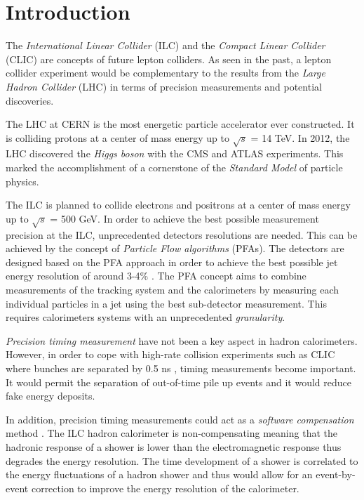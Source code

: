 \chapter{Introduction}

The \textit{International Linear Collider} (ILC) and the \textit{Compact Linear Collider} (CLIC) are concepts of future lepton colliders. As seen in the past, a lepton collider experiment would be complementary to the results from the \textit{Large Hadron Collider} (LHC) in terms of precision measurements and potential discoveries.

The LHC at CERN is the most energetic particle accelerator ever constructed. It is colliding protons at a center of mass energy up to $\sqrt{s}$ = 14 TeV. In 2012, the LHC discovered the \textit{Higgs boson} with the CMS and ATLAS experiments. This marked the accomplishment of a cornerstone of the \textit{Standard Model} of particle physics.

The ILC is planned to collide electrons and positrons at a center of mass energy up to $\sqrt{s}$ = 500 GeV. In order to achieve the best possible measurement precision at the ILC, unprecedented detectors resolutions are needed. This can be achieved by the concept of \textit{Particle Flow algorithms} (PFAs). The detectors are designed based on the PFA approach in order to achieve the best possible jet energy resolution of around 3-4\% \cite{ILC_TDR_Vol1}. The PFA concept aims to combine measurements of the tracking system and the calorimeters by measuring each individual particles in a jet using the best sub-detector measurement. This requires calorimeters systems with an unprecedented \textit{granularity}.

\textit{Precision timing measurement} have not been a key aspect in hadron calorimeters. However, in order to cope with high-rate collision experiments such as CLIC where bunches are separated by 0.5 ns \cite{CLIC_CDR}, timing measurements become important. It would permit the separation of out-of-time pile up events and it would reduce fake energy deposits.

In addition, precision timing measurements could act as a \textit{software compensation} met\-hod \cite{Benaglia2016}. The ILC hadron calorimeter is non-compensating meaning that the hadronic res\-ponse of a shower is lower than the electromagnetic response thus degrades the energy resolution. The time development of a shower is correlated to the energy fluctuations of a hadron shower and thus would allow for an event-by-event correction to improve the energy resolution of the calorimeter.

